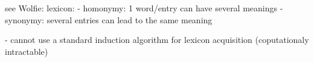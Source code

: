 see Wolfie:
lexicon:
- homonymy: 1 word/entry can have several meanings
- synonymy: several entries can lead to the same meaning

- cannot use a standard induction algorithm for lexicon acquisition
(coputationaly intractable)
